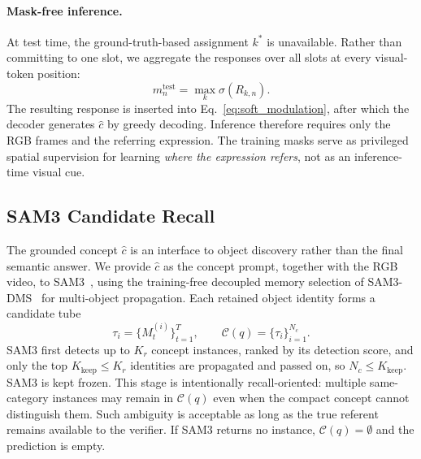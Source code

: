 \paragraph{Mask-free inference.}
At test time, the ground-truth-based assignment $k^{*}$ is unavailable. Rather than committing to one slot, we aggregate the responses over all slots at every visual-token position:
\begin{equation}
 m_n^{\mathrm{test}}
 =
 \max_k \sigma(R_{k,n}).
\label{eq:test_query_aggregation}
\end{equation}
The resulting response is inserted into Eq.~\eqref{eq:soft_modulation}, after which the decoder generates $\hat c$ by greedy decoding. Inference therefore requires only the RGB frames and the referring expression. The training masks serve as privileged spatial supervision for learning \emph{where the expression refers}, not as an inference-time visual cue.

\subsection{SAM3 Candidate Recall}
\label{sec:recall}
The grounded concept $\hat c$ is an interface to object discovery rather than the final semantic answer. We provide $\hat c$ as the concept prompt, together with the RGB video, to SAM3~\cite{carion2025sam3}, using the training-free decoupled memory selection of SAM3-DMS~\cite{shen2026sam3dms} for multi-object propagation. Each retained object identity forms a candidate tube
\begin{equation}
\tau_i=\{M_t^{(i)}\}_{t=1}^{T},
\qquad
\mathcal{C}(q)=\{\tau_i\}_{i=1}^{N_c}.
\end{equation}
SAM3 first detects up to $K_r$ concept instances, ranked by its detection score, and only the top $K_{\mathrm{keep}}\le K_r$ identities are propagated and passed on, so $N_c\le K_{\mathrm{keep}}$. SAM3 is kept frozen. This stage is intentionally recall-oriented: multiple same-category instances may remain in $\mathcal{C}(q)$ even when the compact concept cannot distinguish them. Such ambiguity is acceptable as long as the true referent remains available to the verifier. If SAM3 returns no instance, $\mathcal{C}(q)=\emptyset$ and the prediction is empty.

